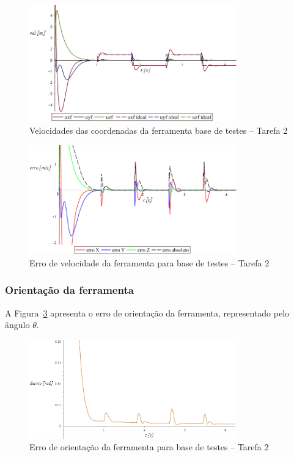 \begin{figure}[h!]
	\centering 
 	\includegraphics[width=0.80\textwidth]{figs/t2_velf_base_testes}
 	\caption{Velocidades das coordenadas da ferramenta base de testes --
 	Tarefa 2}
 	\label{fig::t2_velf_base_testes}
\end{figure}

\begin{figure}[h!]
	\centering 
 	\includegraphics[width=0.80\textwidth]{figs/t2_errovelf_base_testes}
 	\caption{Erro de velocidade da ferramenta para base de testes --
 	Tarefa 2}
 	\label{fig::t2_errovelf_base_testes}
\end{figure}


\subsubsection{Orientação da ferramenta}

A Figura~\ref{fig::t2_erroori_base_testes} apresenta o erro de orientação da
ferramenta, representado pelo ângulo $\theta$.

\begin{figure}[h!]
	\centering 
 	\includegraphics[width=0.80\textwidth]{figs/t2_erroori_base_testes}
 	\caption{Erro de orientação da ferramenta para base de testes -- Tarefa
 	2}
 	\label{fig::t2_erroori_base_testes}
\end{figure}



